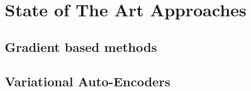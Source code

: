 \chapter{State of The Art Approaches}

\section{Gradient based methods}

\section{Variational Auto-Encoders}
